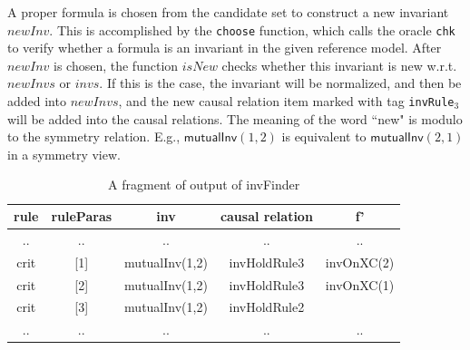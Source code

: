 \documentclass[final]{IEEEtran}
\def \eqc {=}
\def \andc {\wedge }
\def \negc {\lnot}
\begin{document}
{\begin{description}
A proper formula is chosen from the candidate set to construct a new invariant $newInv$. This is accomplished by the {\tt choose} function, which calls the oracle {\tt chk} to verify whether a formula is an invariant in the given reference model. After $newInv$ is chosen, the function $isNew$ checks whether this invariant is new w.r.t. $newInvs$ or $invs$. If this is the case, the invariant will be normalized, and then be  added into $newInvs$, and the new causal relation item marked with tag {\tt invRule$_3$} will be added into the causal relations. The meaning of the word ``new" is modulo to the symmetry relation. E.g., $\mathsf{mutualInv}(1,2)$ is equivalent to
$\mathsf{mutualInv}(2,1)$ in a symmetry view. %


\end{description}


\vspace{-0.5cm}
 \begin{table}[htbp]
\centering \caption{A fragment of output of {\sf invFinder}\label{table:groundCausalRelation}} %
\begin{tabular}{|c|c|c|c|c|  }
\hline
  rule& ruleParas&inv&causal relation &   f'  \\
\hline
  .. & ..&.. &..&.. \\

\hline
  crit  & [1]&mutualInv(1,2)& invHoldRule3 &invOnXC(2) \\
\hline
  crit &[2]& mutualInv(1,2)& invHoldRule3 &invOnXC(1)  \\
\hline
  crit & [3]& mutualInv(1,2) & invHoldRule2  & \\
\hline
  .. & ..&.. &..&.. \\


\end{tabular}
\end{table}}
\end{document}
